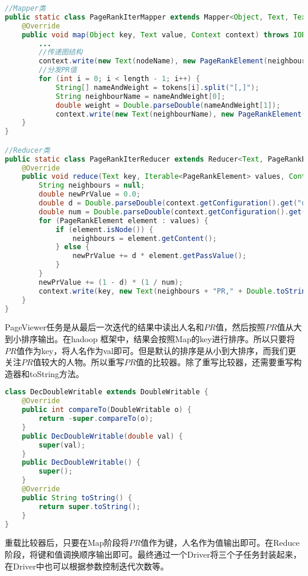 \begin{lstlisting}[language=Java]
//Mapper类
public static class PageRankIterMapper extends Mapper<Object, Text, Text, PageRankElement> {
	@Override
	public void map(Object key, Text value, Context context) throws IOException, InterruptedException {
		...
		//传递图结构
		context.write(new Text(nodeName), new PageRankElement(neighbours.toString()));
		//分发PR值
		for (int i = 0; i < length - 1; i++) {
			String[] nameAndWeight = tokens[i].split("[,]");
			String neighbourName = nameAndWeight[0];
			double weight = Double.parseDouble(nameAndWeight[1]);
			context.write(new Text(neighbourName), new PageRankElement(weight * prValue));
	}
}

//Reducer类
public static class PageRankIterReducer extends Reducer<Text, PageRankElement, Text, Text> {
	@Override
	public void reduce(Text key, Iterable<PageRankElement> values, Context context) throws IOException, InterruptedException{
		String neighbours = null;
		double newPrValue = 0.0;
		double d = Double.parseDouble(context.getConfiguration().get("d"));
		double num = Double.parseDouble(context.getConfiguration().get("num"));
		for (PageRankElement element : values) {
			if (element.isNode()) {
				neighbours = element.getContent();
			} else {
				newPrValue += d * element.getPassValue();
			}
		}
		newPrValue += (1 - d) * (1 / num);
		context.write(key, new Text(neighbours + "PR," + Double.toString(newPrValue)));
	}
}
\end{lstlisting}
\newpage
PageViewer任务是从最后一次迭代的结果中读出人名和$PR$值，然后按照$PR$值从大到小排序输出。在hadoop 框架中，结果会按照Map的key进行排序。所以只要将$PR$值作为key，将人名作为val即可。但是默认的排序是从小到大排序，而我们更关注$PR$值较大的人物。所以重写$PR$值的比较器。除了重写比较器，还需要重写构造器和toString方法。
\begin{lstlisting}[language=Java]
class DecDoubleWritable extends DoubleWritable {
	@Override
	public int compareTo(DoubleWritable o) {
		return -super.compareTo(o);
	}
	public DecDoubleWritable(double val) {
		super(val);
	}
	public DecDoubleWritable() {
		super();
	}
	@Override
	public String toString() {
		return super.toString();
	}
}
\end{lstlisting}

重载比较器后，只要在Map阶段将$PR$值作为键，人名作为值输出即可。在Reduce阶段，将键和值调换顺序输出即可。最终通过一个Driver将三个子任务封装起来，在Driver中也可以根据参数控制迭代次数等。








